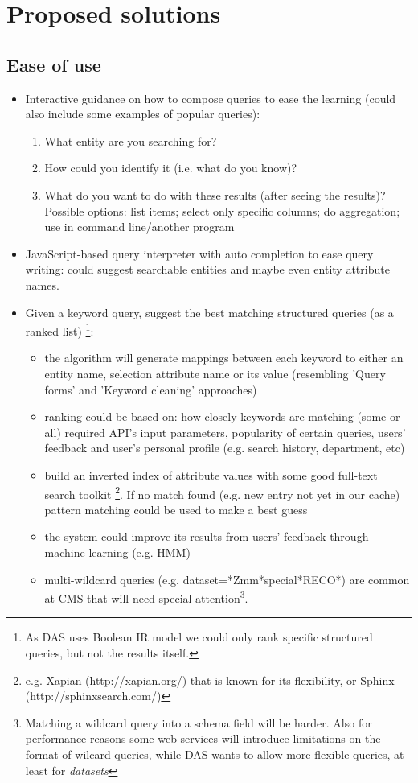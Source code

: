 \section{Proposed solutions}
\subsection{Ease of use}

\begin{itemize}
\item Interactive guidance on how to compose queries to ease the learning (could also include some examples of popular queries):
\begin{enumerate}
\item What entity are you searching for?
\item How could you identify it (i.e. what do you know)?
\item What do you want to do with these results (after seeing the results)? Possible options: list items; select only specific columns; do aggregation; use in command line/another program
\end{enumerate}

\item JavaScript-based query interpreter with auto completion to ease query writing: could suggest searchable entities and maybe even entity attribute names. 

\item Given a keyword query, suggest the best matching structured queries (as a ranked list)%
 	\footnote{As DAS uses Boolean IR model we could only rank specific structured queries, but not the results itself.}:
	\begin{itemize}
	\item the algorithm will generate mappings between each keyword to either an entity name, selection attribute name or its value (resembling 'Query forms' and 'Keyword cleaning' approaches)
	\item ranking could be based on: how closely keywords are matching (some or all) required API's input parameters, popularity of certain queries, users' feedback	 and user's personal profile (e.g. search history, department, etc)
	\item build an inverted index of attribute values with some good full-text search toolkit%
				\footnote{e.g. Xapian (http://xapian.org/) that is known for its flexibility, or Sphinx (http://sphinxsearch.com/)}. 
	If no match found (e.g. new entry not yet in our cache) pattern matching could be used to make a best guess
	\item the system could improve its results from users' feedback through machine learning (e.g. HMM)
	\item multi-wildcard queries (e.g. dataset=*Zmm*special*RECO*) are common at CMS that will need special attention\footnote{%
		Matching a wildcard query into a schema field will be harder. Also for performance reasons some web-services will introduce limitations on the format of wilcard queries, while DAS wants to allow more flexible queries, at least for \textit{datasets}}.
	

\end{itemize}
\end{itemize}
